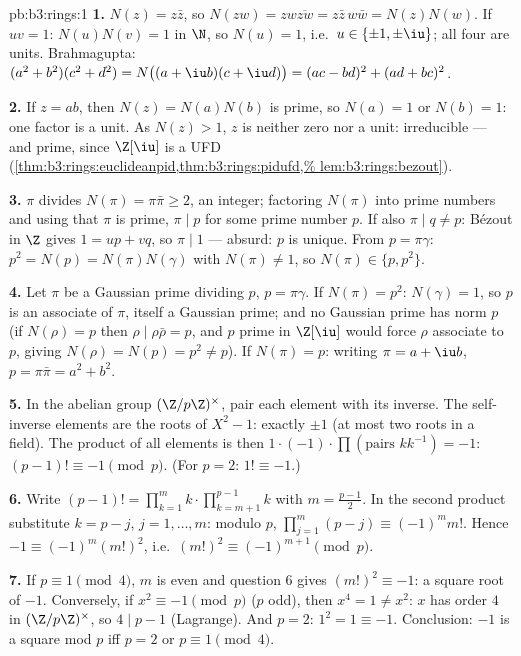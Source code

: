 \begin{solution}{pb:b3:rings:1}
\textbf{1.} $N(z) = z\bar z$, so $N(zw) = zw\overline{zw} = z\bar
z\, w \bar w = N(z)N(w)$. If $uv = 1$: $N(u)N(v) = 1$ in $\N$, so
$N(u) = 1$, i.e.\ $u \in \{\pm 1, \pm \iu\}$; all four are units.
Brahmagupta: $(a^2+b^2)(c^2+d^2) = N\bigl((a + \iu b)(c + \iu
d)\bigr) = (ac - bd)^2 + (ad + bc)^2$.

\textbf{2.} If $z = ab$, then $N(z) = N(a)N(b)$ is prime, so
$N(a) = 1$ or $N(b) = 1$: one factor is a unit. As $N(z) > 1$,
$z$ is neither zero nor a unit: irreducible --- and prime, since
$\Z[\iu]$ is a UFD
(\cref{thm:b3:rings:euclideanpid,thm:b3:rings:pidufd,%
lem:b3:rings:bezout}).

\textbf{3.} $\pi$ divides $N(\pi) = \pi\bar\pi \geq 2$, an
integer; factoring $N(\pi)$ into prime numbers and using that
$\pi$ is prime, $\pi \mid p$ for some prime number $p$. If also
$\pi \mid q \neq p$: B\'ezout in $\Z$ gives $1 = up + vq$, so
$\pi \mid 1$ --- absurd: $p$ is unique. From $p = \pi\gamma$:
$p^2 = N(p) = N(\pi)N(\gamma)$ with $N(\pi) \neq 1$, so $N(\pi)
\in \{p, p^2\}$.

\textbf{4.} Let $\pi$ be a Gaussian prime dividing $p$, $p =
\pi\gamma$. If $N(\pi) = p^2$: $N(\gamma) = 1$, so $p$ is an
associate of $\pi$, itself a Gaussian prime; and no Gaussian
prime has norm $p$ (if $N(\rho) = p$ then $\rho \mid
\rho\bar\rho = p$, and $p$ prime in $\Z[\iu]$ would force
$\rho$ associate to $p$, giving $N(\rho) = N(p) = p^2 \neq
p$).
If $N(\pi) = p$: writing $\pi = a + \iu b$, $p = \pi\bar\pi = a^2
+ b^2$.

\textbf{5.} In the abelian group $(\Z/p\Z)^\times$, pair each
element with its inverse. The self-inverse elements are the roots
of $X^2 - 1$: exactly $\pm 1$ (at most two roots in a field).
The product of all elements is then $1 \cdot (-1) \cdot \prod
(\text{pairs } k k^{-1}) = -1$: $(p-1)! \equiv -1 \pmod p$. (For
$p = 2$: $1! \equiv -1$.)

\textbf{6.} Write $(p-1)! = \prod_{k=1}^m k \cdot
\prod_{k=m+1}^{p-1}k$ with $m = \frac{p-1}2$. In the second
product substitute $k = p - j$, $j = 1, \dots, m$: modulo $p$,
$\prod_{j=1}^m (p - j) \equiv (-1)^m m!$. Hence $-1 \equiv
(-1)^m (m!)^2$, i.e.\ $(m!)^2 \equiv (-1)^{m+1} \pmod p$.

\textbf{7.} If $p \equiv 1 \pmod 4$, $m$ is even and question 6
gives $(m!)^2 \equiv -1$: a square root of $-1$. Conversely, if
$x^2 \equiv -1 \pmod p$ ($p$ odd), then $x^4 = 1 \neq x^2$: $x$
has order $4$ in $(\Z/p\Z)^\times$, so $4 \mid p - 1$ (Lagrange).
And $p = 2$: $1^2 = 1 \equiv -1$. Conclusion: $-1$ is a square
mod $p$ iff $p = 2$ or $p \equiv 1 \pmod 4$.


\end{solution}
